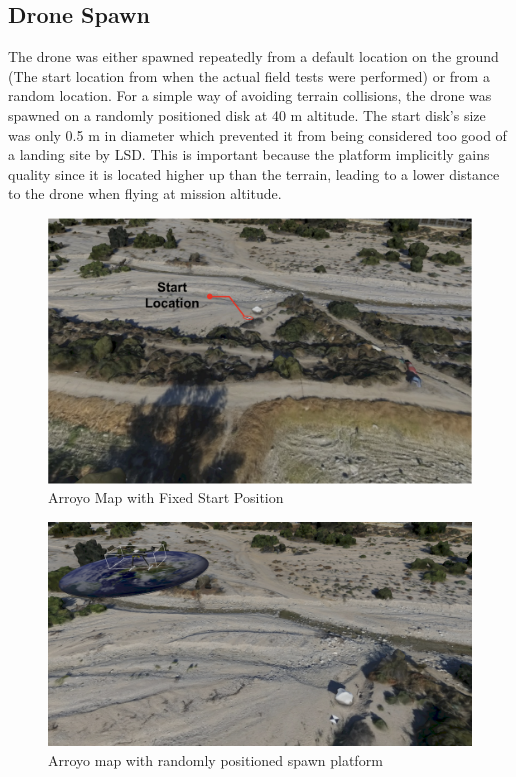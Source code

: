 \subsection{Drone Spawn}
The drone was either spawned repeatedly from a default location on the ground (The start location from when the actual field tests were performed) or from a random location. For a simple way of avoiding terrain collisions, the drone was spawned on a randomly positioned disk at 40 m altitude. The start disk's size was only 0.5 m in diameter which prevented it from being considered too good of a landing site by LSD. This is important because the platform implicitly gains quality since it is located higher up than the terrain, leading to a lower distance to the drone when flying at mission altitude.
\begin{figure}[h]
    \centering
    \includegraphics[scale=0.42]{images/evaluation/arroyo_with_start.png}
    \caption{Arroyo Map with Fixed Start Position}
    \label{fig:fixed_start}
\end{figure}
\begin{figure}[h]
    \centering
    \includegraphics[scale=0.2]{images/evaluation/arroyo_with_platform.png}
    \caption{Arroyo map with randomly positioned spawn platform}
    \label{fig:random_start}
\end{figure}
\clearpage %


